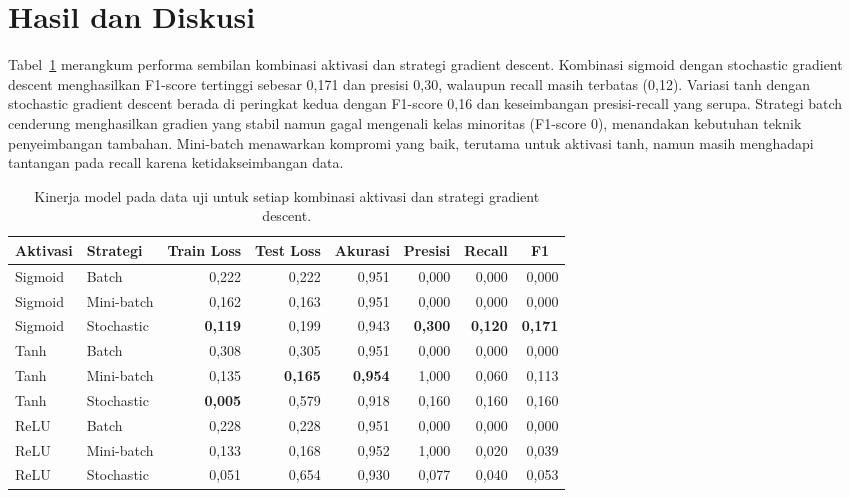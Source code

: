 \documentclass[12pt]{article}
\begin{document}
\section*{Hasil dan Diskusi}
Tabel~\ref{tab:metrics} merangkum performa sembilan kombinasi aktivasi dan strategi gradient descent. Kombinasi sigmoid dengan stochastic gradient descent menghasilkan F1-score tertinggi sebesar 0,171 dan presisi 0,30, walaupun recall masih terbatas (0,12). Variasi tanh dengan stochastic gradient descent berada di peringkat kedua dengan F1-score 0,16 dan keseimbangan presisi-recall yang serupa. Strategi batch cenderung menghasilkan gradien yang stabil namun gagal mengenali kelas minoritas (F1-score 0), menandakan kebutuhan teknik penyeimbangan tambahan. Mini-batch menawarkan kompromi yang baik, terutama untuk aktivasi tanh, namun masih menghadapi tantangan pada recall karena ketidakseimbangan data.

\begin{table}[htbp]
    \centering
    \caption{Kinerja model pada data uji untuk setiap kombinasi aktivasi dan strategi gradient descent.}
    \label{tab:metrics}
    \small
    \begin{tabular}{llrrrrrr}
        \toprule
        Aktivasi & Strategi & \multicolumn{1}{c}{Train Loss} & \multicolumn{1}{c}{Test Loss} & \multicolumn{1}{c}{Akurasi} & \multicolumn{1}{c}{Presisi} & \multicolumn{1}{c}{Recall} & \multicolumn{1}{c}{F1} \\
        \midrule
        Sigmoid & Batch & 0{,}222 & 0{,}222 & 0{,}951 & 0{,}000 & 0{,}000 & 0{,}000 \\
        Sigmoid & Mini-batch & 0{,}162 & 0{,}163 & 0{,}951 & 0{,}000 & 0{,}000 & 0{,}000 \\
        Sigmoid & Stochastic & \textbf{0{,}119} & 0{,}199 & 0{,}943 & \textbf{0{,}300} & \textbf{0{,}120} & \textbf{0{,}171} \\
        Tanh & Batch & 0{,}308 & 0{,}305 & 0{,}951 & 0{,}000 & 0{,}000 & 0{,}000 \\
        Tanh & Mini-batch & 0{,}135 & \textbf{0{,}165} & \textbf{0{,}954} & 1{,}000 & 0{,}060 & 0{,}113 \\
        Tanh & Stochastic & \textbf{0{,}005} & 0{,}579 & 0{,}918 & 0{,}160 & 0{,}160 & 0{,}160 \\
        ReLU & Batch & 0{,}228 & 0{,}228 & 0{,}951 & 0{,}000 & 0{,}000 & 0{,}000 \\
        ReLU & Mini-batch & 0{,}133 & 0{,}168 & 0{,}952 & 1{,}000 & 0{,}020 & 0{,}039 \\
        ReLU & Stochastic & 0{,}051 & 0{,}654 & 0{,}930 & 0{,}077 & 0{,}040 & 0{,}053 \\
        \bottomrule
    \end{tabular}
\end{table}
\end{document}
